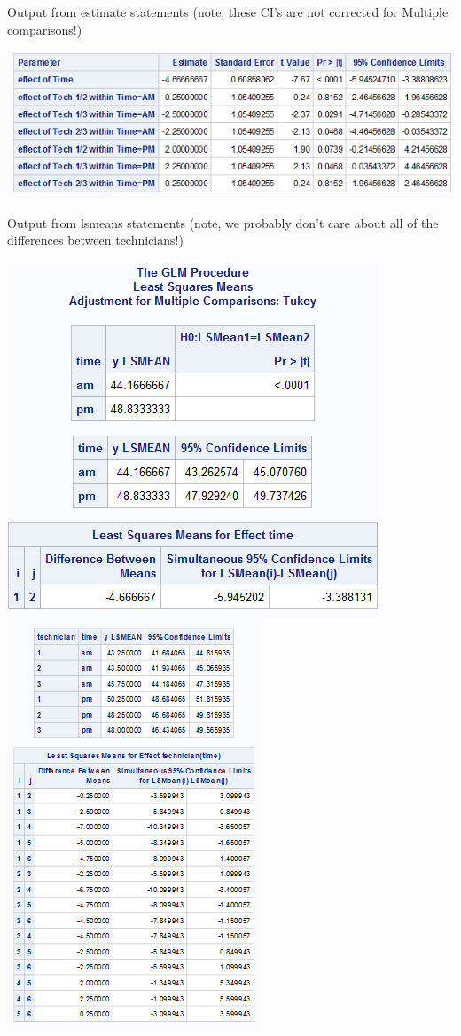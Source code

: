 \begin{enumerate}
\newpage

Output from estimate statements (note, these CI's are not corrected for Multiple comparisons!)

\begin{center}
\includegraphics[scale=0.7]{NestedSAS5}
\end{center}


Output from lsmeans statements (note, we probably don't care about all of the differences between technicians!)

\begin{center}
\includegraphics[scale=0.7]{NestedSAS3}\includegraphics[scale=1]{NestedSAS4}
\end{center}

\end{enumerate}